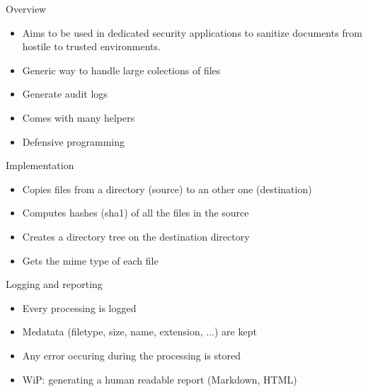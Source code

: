 
\begin{frame}[t,plain]
    \titlepage
\end{frame}

\begin{frame}[fragile]{Overview}
    \begin{itemize}
        \item Aims to be used in dedicated security applications to sanitize documents from hostile to trusted environments.
        \item Generic way to handle large colections of files
        \item Generate audit logs
        \item Comes with many helpers
        \item Defensive programming
   \end{itemize}
\end{frame}

\begin{frame}[fragile]{Implementation}
    \begin{itemize}
        \item Copies files from a directory (source) to an other one (destination)
        \item Computes hashes (sha1) of all the files in the source
        \item Creates a directory tree on the destination directory
        \item Gets the mime type of each file
   \end{itemize}
\end{frame}

\begin{frame}[fragile]{Logging and reporting}
    \begin{itemize}
        \item Every processing is logged
        \item Medatata (filetype, size, name, extension, ...) are kept
        \item Any error occuring during the processing is stored
        \item WiP: generating a human readable report (Markdown, HTML)
   \end{itemize}
\end{frame}

